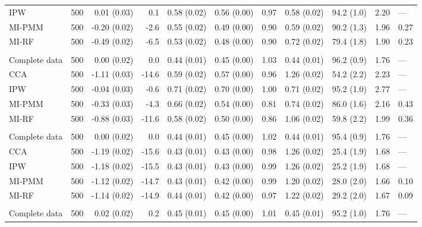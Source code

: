 \documentclass[11pt,a4paper]{article}
\begin{document}
\begin{landscape}
\begin{longtable}{l|rrrrrrrrrl}
IPW & 500 & 0.01 (0.03) & 0.1 & 0.58 (0.02) & 0.56 (0.00) & 0.97 & 0.58 (0.02) & 94.2 (1.0) & 2.20 & — \\ 
MI-PMM & 500 & -0.20 (0.02) & -2.6 & 0.55 (0.02) & 0.49 (0.00) & 0.90 & 0.59 (0.02) & 90.2 (1.3) & 1.96 & 0.27 \\ 
MI-RF & 500 & -0.49 (0.02) & -6.5 & 0.53 (0.02) & 0.48 (0.00) & 0.90 & 0.72 (0.02) & 79.4 (1.8) & 1.90 & 0.23 \\ 
\midrule\addlinespace[2.5pt]
\multicolumn{11}{l}{Wasting — MAR-strong 50\%} \\[2.5pt] 
\midrule\addlinespace[2.5pt]
Complete data & 500 & 0.00 (0.02) & 0.0 & 0.44 (0.01) & 0.45 (0.00) & 1.03 & 0.44 (0.01) & 96.2 (0.9) & 1.76 & — \\ 
CCA & 500 & -1.11 (0.03) & -14.6 & 0.59 (0.02) & 0.57 (0.00) & 0.96 & 1.26 (0.02) & 54.2 (2.2) & 2.23 & — \\ 
IPW & 500 & -0.04 (0.03) & -0.6 & 0.71 (0.02) & 0.70 (0.00) & 1.00 & 0.71 (0.02) & 95.2 (1.0) & 2.77 & — \\ 
MI-PMM & 500 & -0.33 (0.03) & -4.3 & 0.66 (0.02) & 0.54 (0.00) & 0.81 & 0.74 (0.02) & 86.0 (1.6) & 2.16 & 0.43 \\ 
MI-RF & 500 & -0.88 (0.03) & -11.6 & 0.58 (0.02) & 0.50 (0.00) & 0.86 & 1.06 (0.02) & 59.8 (2.2) & 1.99 & 0.36 \\ 
\midrule\addlinespace[2.5pt]
\multicolumn{11}{l}{Wasting — MNAR 10\%} \\[2.5pt] 
\midrule\addlinespace[2.5pt]
Complete data & 500 & 0.00 (0.02) & 0.0 & 0.44 (0.01) & 0.45 (0.00) & 1.02 & 0.44 (0.01) & 95.4 (0.9) & 1.76 & — \\ 
CCA & 500 & -1.19 (0.02) & -15.6 & 0.43 (0.01) & 0.43 (0.00) & 0.98 & 1.26 (0.02) & 25.4 (1.9) & 1.68 & — \\ 
IPW & 500 & -1.18 (0.02) & -15.5 & 0.43 (0.01) & 0.43 (0.00) & 0.99 & 1.26 (0.02) & 25.2 (1.9) & 1.68 & — \\ 
MI-PMM & 500 & -1.12 (0.02) & -14.7 & 0.43 (0.01) & 0.42 (0.00) & 0.99 & 1.20 (0.02) & 28.0 (2.0) & 1.66 & 0.10 \\ 
MI-RF & 500 & -1.14 (0.02) & -14.9 & 0.44 (0.01) & 0.42 (0.00) & 0.97 & 1.22 (0.02) & 29.2 (2.0) & 1.67 & 0.09 \\ 
\midrule\addlinespace[2.5pt]
\multicolumn{11}{l}{Wasting — MNAR 30\%} \\[2.5pt] 
\midrule\addlinespace[2.5pt]
Complete data & 500 & 0.02 (0.02) & 0.2 & 0.45 (0.01) & 0.45 (0.00) & 1.01 & 0.45 (0.01) & 95.2 (1.0) & 1.76 & — \\ 

\end{longtable}
\end{landscape}
\end{document}
